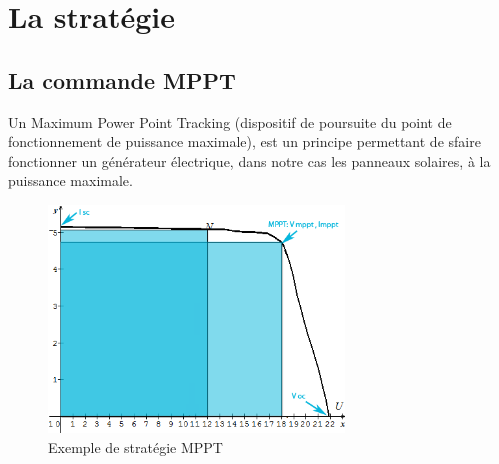  
\section{La stratégie}

\subsection{La commande MPPT}
Un Maximum Power Point Tracking (dispositif de poursuite du point de fonctionnement de puissance maximale), est un principe permettant de sfaire fonctionner un générateur électrique, dans notre cas les panneaux solaires, à la puissance maximale.

\begin{figure}[ht]
	\begin{center}
	\includegraphics[width=0.7\textwidth]{images/MPPT.png}
	\caption{Exemple de stratégie MPPT}\label{img:courbe MPPT}
	\end{center}
\end{figure}
\FloatBarrier 

